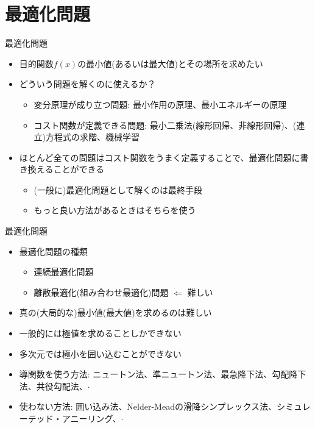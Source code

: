 \section{最適化問題}

\begin{frame}[t,fragile]{最適化問題}
  \begin{itemize}
    \setlength{\itemsep}{1em}
  \item 目的関数$f(x)$の最小値(あるいは最大値)とその場所を求めたい
  \item どういう問題を解くのに使えるか？
    \begin{itemize}
    \item 変分原理が成り立つ問題: 最小作用の原理、最小エネルギーの原理
    \item コスト関数が定義できる問題: 最小二乗法(線形回帰、非線形回帰)、(連立)方程式の求階、機械学習
    \end{itemize}
  \item ほとんど全ての問題はコスト関数をうまく定義することで、最適化問題に書き換えることができる
    \begin{itemize}
    \item (一般に)最適化問題として解くのは最終手段
    \item もっと良い方法があるときはそちらを使う
    \end{itemize}
  \end{itemize}
\end{frame}

\begin{frame}[t,fragile]{最適化問題}
  \begin{itemize}
  \item 最適化問題の種類
    \begin{itemize}
    \item 連続最適化問題
    \item 離散最適化(組み合わせ最適化)問題 $\Leftarrow$ 難しい
    \end{itemize}
  \item 真の(大局的な)最小値(最大値)を求めるのは難しい
  \item 一般的には極値を求めることしかできない
  \item 多次元では極小を囲い込むことができない
  \item 導関数を使う方法: ニュートン法、準ニュートン法、最急降下法、勾配降下法、共役勾配法、$\cdot$
  \item 使わない方法: 囲い込み法、Nelder-Meadの滑降シンプレックス法、シミュレーテッド・アニーリング、$\cdot$
  \end{itemize}
\end{frame}
